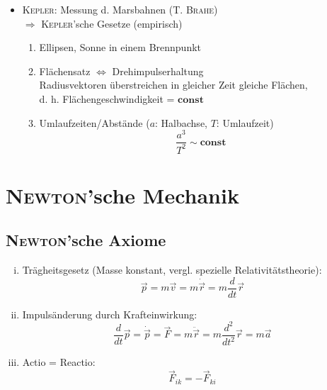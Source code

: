 \begin{itemize}
    \item \textsc{Kepler:} Messung d. Marsbahnen (T. \textsc{Brahe})\\
          $\Rightarrow$ \textsc{Kepler}'sche Gesetze (empirisch)
          \begin{enumerate}
              \item Ellipsen, Sonne in einem Brennpunkt
              \item Flächensatz $\Leftrightarrow$ Drehimpulserhaltung \\
                    Radiusvektoren überstreichen in gleicher Zeit gleiche Flächen,\\
                    d. h. Flächengeschwindigkeit = $\mathbf{const}$
              \item Umlaufzeiten/Abstände ($a$: Halbachse, $T$: Umlaufzeit)
                      \[ \frac{a^3}{T^2} \sim \mathbf{const} \]
          \end{enumerate}
\end{itemize}

\section{\textsc{Newton}'sche Mechanik}
\subsection{\textsc{Newton}'sche Axiome}
\begin{enumerate}[(i)]
    \item Trägheitsgesetz (Masse konstant, vergl. spezielle Relativitätstheorie):
        \begin{equation}
            \vec p = m \vec v = m \dot{\vec{r}} = m \frac{d}{dt} \vec r
            \label{eq:newton1}
        \end{equation}
    \item Impulsänderung durch Krafteinwirkung:
        \begin{equation}
            \frac{d}{dt} \vec p = \dot{\vec p} = \vec F = m \ddot{\vec r} = m \frac{d^2}{dt^2} \vec r = m \vec a
            \label{eq:newton2}
        \end{equation}
    \item Actio = Reactio:
        \begin{equation}
            \vec F_{ik} = -\vec F_{ki}
            \label{eq:newton3}
        \end{equation}
\end{enumerate}

